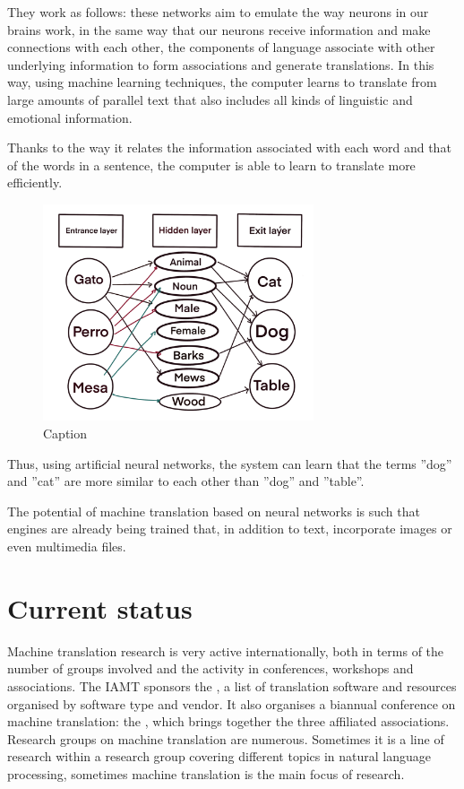 \documentclass[a4paper]{article}
\theoremstyle{plain}
\theoremstyle{definition}
\begin{document}
    They work as follows: these networks aim to emulate the way neurons in our brains work, in the same way that our neurons receive information and make connections with each other, the components of language associate with other underlying information to form associations and generate translations. In this way, using machine learning techniques, the computer learns to translate from large amounts of parallel text that also includes all kinds of linguistic and emotional information.

    Thanks to the way it relates the information associated with each word and that of the words in a sentence, the computer is able to learn to translate more efficiently.
	\begin{figure}
	    \centering
	    \includegraphics[width=8cm]{neuronal.PNG}
	    \caption{Caption}
	    \label{fig:my_label}
	\end{figure}
		\newpage
	Thus, using artificial neural networks, the system can learn that the terms ''dog'' and ''cat'' are more similar to each other than ''dog'' and ''table''.

    The potential of machine translation based on neural networks is such that engines are already being trained that, in addition to text, incorporate images or even multimedia files.
	
	
	
	
	

	\section{Current status}
	Machine translation research is very active internationally, both in terms of the number of groups involved and the activity in conferences, workshops and associations. The IAMT sponsors the , a list of translation software and resources organised by software type and vendor. It also organises a biannual conference on machine translation: the , which brings together the three affiliated associations. Research groups on machine translation are numerous. Sometimes it is a line of research within a research group covering different topics in natural language processing, sometimes machine translation is the main focus of research.
\end{document}
